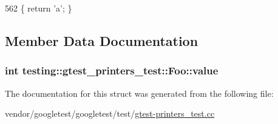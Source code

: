 \begin{DoxyCode}
562 \{ \textcolor{keywordflow}{return} \textcolor{charliteral}{'a'}; \}
\end{DoxyCode}


\subsection{Member Data Documentation}
\subsubsection[{\texorpdfstring{value}{value}}]{\setlength{\rightskip}{0pt plus 5cm}int testing\+::gtest\+\_\+printers\+\_\+test\+::\+Foo\+::value}\hypertarget{structtesting_1_1gtest__printers__test_1_1Foo_a8171a69191d34071ea4448d2dda501ec}{}\label{structtesting_1_1gtest__printers__test_1_1Foo_a8171a69191d34071ea4448d2dda501ec}


The documentation for this struct was generated from the following file\+:\begin{DoxyCompactItemize}
\item 
vendor/googletest/googletest/test/\hyperlink{gtest-printers__test_8cc}{gtest-\/printers\+\_\+test.\+cc}\end{DoxyCompactItemize}
